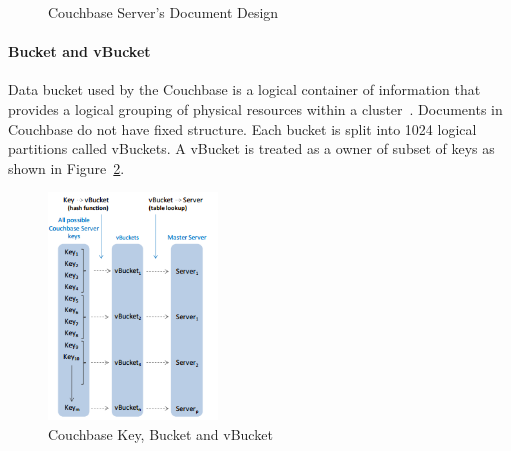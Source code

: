 \begin{figure}[h]
	\centering
	\centering
	\caption{Couchbase Server's Document Design ~\citep{couchbasedocs}}
	\label{fig:cb-views-document-design}	
\end{figure}

\paragraph{Bucket and vBucket}
 Data bucket used by the Couchbase is a logical container of information that provides a logical grouping of physical resources within a cluster~\citep{lichtenberg2013nosql}. Documents in Couchbase do not have fixed structure. Each bucket is split into 1024 logical partitions called vBuckets. A vBucket is treated as a owner of subset of keys as shown in Figure~\ref{fig:cb-vbucket}.  

\begin{figure}[h]
	\centering
	\includegraphics[width=0.4\textwidth]{img/vbucket2}
	\caption{ Couchbase Key, Bucket and   vBucket ~\cite{couchbasedocs}}
	\label{fig:cb-vbucket}
\end{figure}

